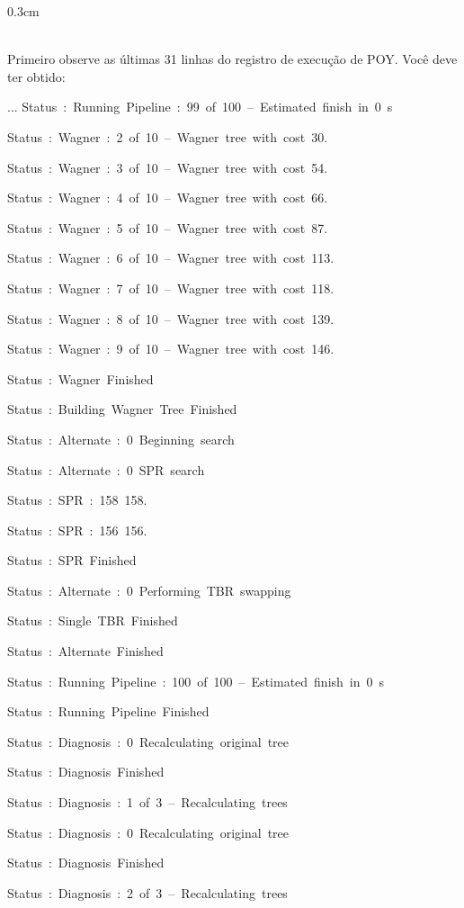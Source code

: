 \begin{refsection}
\begin {myindentpar}{0.3cm}
\begin{enumerate}[\itshape i.]
\\

Primeiro observe as últimas 31 linhas do registro de execução de POY. Você deve ter obtido:

\scriptsize

...
Status~:~Running~Pipeline~:~99~of~100~--~Estimated~finish~in~0~s

Status~:~Wagner~:~2~of~10~--~Wagner~tree~with~cost~30.

Status~:~Wagner~:~3~of~10~--~Wagner~tree~with~cost~54.

Status~:~Wagner~:~4~of~10~--~Wagner~tree~with~cost~66.

Status~:~Wagner~:~5~of~10~--~Wagner~tree~with~cost~87.

Status~:~Wagner~:~6~of~10~--~Wagner~tree~with~cost~113.

Status~:~Wagner~:~7~of~10~--~Wagner~tree~with~cost~118.

Status~:~Wagner~:~8~of~10~--~Wagner~tree~with~cost~139.

Status~:~Wagner~:~9~of~10~--~Wagner~tree~with~cost~146.

Status~:~Wagner~Finished

Status~:~Building~Wagner~Tree~Finished

Status~:~Alternate~:~0~Beginning~search

Status~:~Alternate~:~0~SPR~search

Status~:~SPR~:~158~158.

Status~:~SPR~:~156~156.

Status~:~SPR~Finished

Status~:~Alternate~:~0~Performing~TBR~swapping

Status~:~Single~TBR~Finished

Status~:~Alternate~Finished

Status~:~Running~Pipeline~:~100~of~100~--~Estimated~finish~in~0~s

Status~:~Running~Pipeline~Finished

Status~:~Diagnosis~:~0~Recalculating~original~tree

Status~:~Diagnosis~Finished

Status~:~Diagnosis~:~1~of~3~--~Recalculating~trees

Status~:~Diagnosis~:~0~Recalculating~original~tree

Status~:~Diagnosis~Finished

Status~:~Diagnosis~:~2~of~3~--~Recalculating~trees


\end{enumerate}
\end{myindentpar}
\end{refsection}
